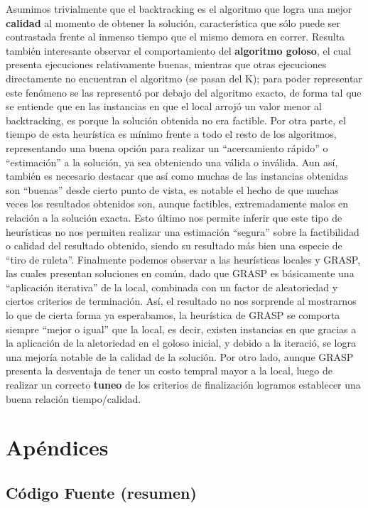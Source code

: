 \documentclass[12pt, a4paper, twoside]{article}
\begin{document}
\begin{TP3}
  Asumimos trivialmente que el backtracking es el algoritmo que logra una mejor \textbf{calidad} al momento de obtener la solución, característica que sólo puede ser contrastada frente al inmenso tiempo que el mismo demora en correr. Resulta también interesante observar el comportamiento del \textbf{algoritmo goloso}, el cual presenta ejecuciones relativamente buenas, mientras que otras ejecuciones directamente no encuentran el algoritmo (se pasan del K); para poder representar este fenómeno se las representó por debajo del algoritmo exacto, de forma tal que se entiende que en las instancias en que el local arrojó un valor menor al backtracking, es porque la solución obtenida no era factible. Por otra parte, el tiempo de esta heurística es mínimo frente a todo el resto de los algoritmos, representando una buena opción para realizar un ``acercamiento rápido'' o ``estimación'' a la solución, ya sea obteniendo una válida o inválida. Aun así, también es necesario destacar que así como muchas de las instancias obtenidas son ``buenas'' desde cierto punto de vista, es notable el hecho de que muchas veces los resultados obtenidos son, aunque factibles, extremadamente malos en relación a la solución exacta. Esto último nos permite inferir que este tipo de heurísticas no nos permiten realizar una estimación ``segura'' sobre la factibilidad o calidad del resultado obtenido, siendo su resultado más bien una especie de ``tiro de ruleta''. Finalmente podemos observar a las heurísticas locales y GRASP, las cuales presentan soluciones en común, dado que GRASP es básicamente una ``aplicación iterativa'' de la local, combinada con un factor de aleatoriedad y ciertos criterios de terminación. Así, el resultado no nos sorprende al mostrarnos lo que de cierta forma ya esperabamos, la heurística de GRASP se comporta siempre ``mejor o igual'' que la local, es decir, existen instancias en que gracias a la aplicación de la aletoriedad en el goloso inicial, y debido a la iteració, se logra una mejoría notable de la calidad de la solución. Por otro lado, aunque GRASP presenta la desventaja de tener un costo tempral mayor a la local, luego de realizar un correcto \textbf{tuneo} de los criterios de finalización logramos establecer una buena relación tiempo/calidad.

  \newpage
\section{Apéndices}\label{sec:apendices}
  
  \subsection{Código Fuente (resumen)}\label{subsec:codigo-fuente}
  
  \clearpage
  

\end{TP3}
\end{document}

